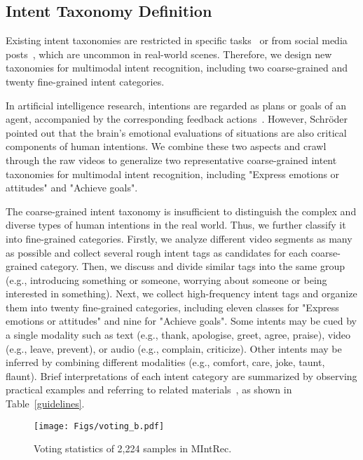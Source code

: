 \documentclass[sigconf,camera-ready]{acmart}
\begin{document}
\subsection{Intent Taxonomy Definition}
Existing intent taxonomies are restricted in specific tasks~\cite{coucke2018snips,larson2019evaluation,casanueva2020efficient} or from social media posts~\cite{kruk-etal-2019-integrating,jia2021intentonomy}, which are uncommon in real-world scenes. Therefore, we design new taxonomies for multimodal intent recognition, including two coarse-grained and twenty fine-grained intent categories. 

In artificial intelligence research, intentions are regarded as plans or goals of an agent, accompanied by the corresponding feedback actions~\cite{bratman1988intention,wooldridge1995intelligent}. However, Schr{\"o}der~\cite{schroder2014intention} pointed out that the brain's emotional evaluations of situations are also critical components of human intentions. We combine these two aspects and crawl through the raw videos to generalize two representative coarse-grained intent taxonomies for multimodal intent recognition, including "Express emotions or attitudes" and "Achieve goals".

The coarse-grained intent taxonomy is insufficient to distinguish the complex and diverse types of human intentions in the real world. Thus, we further classify it into fine-grained categories. Firstly, we analyze different video segments as many as possible and collect several rough intent tags as candidates for each coarse-grained category. Then, we discuss and divide similar tags into the same group (e.g., introducing something or someone, worrying about someone or being interested in something). Next, we collect high-frequency intent tags and organize them into twenty fine-grained categories, including eleven classes for "Express emotions or attitudes" and nine for "Achieve goals". Some intents may be cued by a single modality such as text (e.g., thank, apologise, greet, agree, praise), video (e.g., leave, prevent), or audio (e.g., complain, criticize). Other intents may be inferred by combining different modalities (e.g., comfort, care, joke, taunt, flaunt). Brief interpretations of each intent category are summarized by observing practical examples and referring to related materials~\cite{dictionary1989oxford}, as shown in Table~\ref{guidelines}.
\begin{figure}[t!]\small
	\centering  
	\texttt{[image: Figs/voting\_b.pdf]}
	\caption{\label{detailed_votes} Voting statistics of 2,224 samples in MIntRec.
	}
\end{figure}
\end{document}

